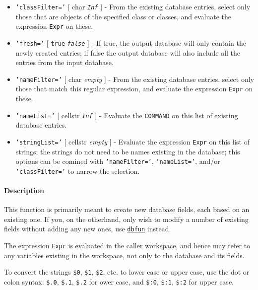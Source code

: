  \begin{itemize}
 \item
   \texttt{'classFilter='} {[} char \textbar{} \emph{\texttt{Inf}} {]} -
   From the existing database entries, select only those that are objects
   of the specified class or classes, and evaluate the expression
   \texttt{Expr} on these.
 \item
   \texttt{'fresh='} {[} \texttt{true} \textbar{} \emph{\texttt{false}}
   {]} - If true, the output database will only contain the newly created
   entries; if false the output database will also include all the
   entries from the input database.
 \item
   \texttt{'nameFilter='} {[} char \textbar{} \emph{empty} {]} - From the
   existing database entries, select only those that match this regular
   expression, and evaluate the expression \texttt{Expr} on these.
 \item
   \texttt{'nameList='} {[} cellstr \textbar{} \emph{\texttt{Inf}} {]} -
   Evaluate the \texttt{COMMAND} on this list of existing database
   entries.
 \item
   \texttt{'stringList='} {[} cellstr \textbar{} \emph{empty} {]} -
   Evaluate the expression \texttt{Expr} on this list of strings; the
   strings do not need to be names existing in the database; this options
   can be comined with \texttt{'nameFilter='}, \texttt{'nameList='},
   and/or \texttt{'classFilter='} to narrow the selection.
 \end{itemize}
 
 \paragraph{Description}
 
 This function is primarily meant to create new database fields, each
 based on an existing one. If you, on the otherhand, only wish to modify
 a number of existing fields without adding any new ones, use
 \href{dbase/dbfun}{\texttt{dbfun}} instead.
 
 The expression \texttt{Expr} is evaluated in the caller workspace, and
 hence may refer to any variables existing in the workspace, not only to
 the database and its fields.
 
 To convert the strings \texttt{\$0}, \texttt{\$1}, \texttt{\$2}, etc. to
 lower case or upper case, use the dot or colon syntax: \texttt{\$.0},
 \texttt{\$.1}, \texttt{\$.2} for ower case, and \texttt{\$:0},
 \texttt{\$:1}, \texttt{\$:2} for upper case.
 
